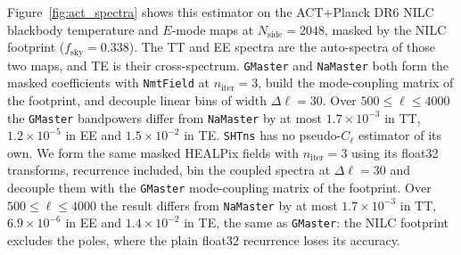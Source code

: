 \documentclass[letters,usenatbib,useAMS]{mnras}
\begin{document}
Figure~\ref{fig:act_spectra} shows this estimator on the ACT+Planck DR6 NILC blackbody temperature and $E$-mode maps at $N_{\mathrm{side}}=2048$, masked by the NILC footprint ($f_{\mathrm{sky}}=0.338$). The TT and EE spectra are the auto-spectra of those two maps, and TE is their cross-spectrum. \texttt{GMaster} and \texttt{NaMaster} both form the masked coefficients with \texttt{NmtField} at $n_{\mathrm{iter}}=3$, build the mode-coupling matrix of the footprint, and decouple linear bins of width $\Delta\ell=30$. Over $500\le\ell\le4000$ the \texttt{GMaster} bandpowers differ from \texttt{NaMaster} by at most $1.7\times10^{-3}$ in TT, $1.2\times10^{-5}$ in EE and $1.5\times10^{-2}$ in TE. \texttt{SHTns} has no pseudo-$C_\ell$ estimator of its own. We form the same masked HEALPix fields with $n_{\mathrm{iter}}=3$ using its float32 transforms, recurrence included, bin the coupled spectra at $\Delta\ell=30$ and decouple them with the \texttt{GMaster} mode-coupling matrix of the footprint. Over $500\le\ell\le4000$ the result differs from \texttt{NaMaster} by at most $1.7\times10^{-3}$ in TT, $6.9\times10^{-6}$ in EE and $1.4\times10^{-2}$ in TE, the same as \texttt{GMaster}: the NILC footprint excludes the poles, where the plain float32 recurrence loses its accuracy.
\end{document}
